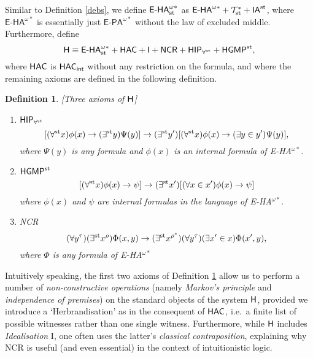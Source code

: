 \documentclass[reqno]{amsart}
\newtheorem{defi}[thm]{Definition}
\def\bdefi{\begin{defi}\rm}
\def\edefi{\end{defi}}
\def\H{\textup{\textsf{H}}}
\def\T{\mathcal{T}}
\def\I{{\textsf{\textup{I}}}}
\def\st{\textup{st}}
\def\di{\rightarrow}
\def\NCR{\textup{\textsf{NCR}}}
\def\HAC{\textup{\textsf{HAC}}}
\def\INT{\textup{\textsf{int}}}
\numberwithin{equation}{section}
\numberwithin{thm}{section}
\begin{document}
Similar to Definition \ref{debs}, we define $ \textsf{E-HA}^{\omega*}_{\st} $ as $ \textsf{E-HA}^{\omega{*}} + \T^{*}_{\st} + \textsf{IA}^{\st}$, where $\textsf{E-HA}^{\omega*}$ is essentially just $\textsf{E-PA}^{\omega*}$ without the law of excluded middle.  
Furthermore, define
\[
\H\equiv \textup{\textsf{E-HA}}^{\omega*}_{\st}+\HAC + {\I}+\NCR+\textsf{HIP}_{\forall^{\st}}+\textsf{HGMP}^{\st},
\]
where $\HAC$ is $\HAC_{\INT}$ without any restriction on the formula, and where the remaining axioms are defined in the following definition.
\bdefi[Three axioms of $\H$]\label{flah}~
\begin{enumerate}\rm
\item $\textsf{HIP}_{\forall^{\st}}$
\[
[(\forall^{\st}x)\phi(x)\di (\exists^{\st}y)\Psi(y)]\di (\exists^{\st}y')[(\forall^{\st}x)\phi(x)\di (\exists y\in y')\Psi(y)],
\]
where $\Psi(y)$ is any formula and $\phi(x)$ is an internal formula of \textsf{E-HA}$^{\omega*}$. 
\item $\textsf{HGMP}^{\st}$
\[
[(\forall^{\st}x)\phi(x)\di \psi] \di (\exists^{\st}x')[(\forall x\in x')\phi(x)\di \psi] 
\]
where $\phi(x)$ and $\psi$ are internal formulas in the language of \textsf{E-HA}$^{\omega*}$.
\item \textsf{NCR}
\[
(\forall y^{\tau})(\exists^{\st} x^{\rho} )\Phi(x, y) \di (\exists^{\st} x^{\rho^{*}})(\forall y^{\tau})(\exists x'\in x )\Phi(x', y),
\]
where $\Phi$ is any formula of \textsf{E-HA}$^{\omega*}$
\end{enumerate}
\edefi
Intuitively speaking, the first two axioms of Definition \ref{flah} allow us to perform a number of \emph{non-constructive operations} (namely \emph{Markov's principle} and \emph{independence of premises}) 
on the standard objects of the system $\H$, provided we introduce a `Herbrandisation' as in the consequent of $\HAC$, i.e.\ a finite list of possible witnesses rather than one single witness. 
Furthermore, while $\H$ includes \emph{Idealisation} \textsf{I}, one often uses the latter's \emph{classical contraposition}, explaining why \textsf{NCR} is useful (and even essential) in the context of intuitionistic logic.  

\medskip
\end{document}
